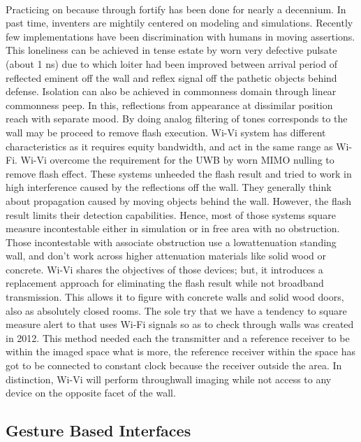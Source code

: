 \documentclass[a4paper,12pt,oneside]{article}
\begin{document}
\paragraph{}
Practicing on because through fortify has been done for nearly a decennium. In past time,
inventers are mightily centered on modeling and simulations. Recently few implementations
have been discrimination with humans in moving assertions. This loneliness can be achieved in
tense estate by worn very defective pulsate (about 1 ns) due to which loiter had been improved
between arrival period of reflected eminent off the wall and reflex signal off the pathetic objects
behind defense. Isolation can also be achieved in commonness domain through linear
commonness peep. In this, reflections from appearance at dissimilar position reach with separate
mood. By doing analog filtering of tones corresponds to the wall may be proceed to remove flash
execution. Wi-Vi system has different characteristics as it requires equity bandwidth, and act in
the same range as Wi-Fi. Wi-Vi overcome the requirement for the UWB by worn MIMO nulling
to remove flash effect. These systems unheeded the flash result and tried to work in high
interference caused by the reflections off the wall. They generally think about propagation
caused by moving objects behind the wall. However, the flash result limits their detection
capabilities. Hence, most of those systems square measure incontestable either in simulation or
in free area with no obstruction. Those incontestable with associate obstruction use a lowattenuation
standing wall, and don't work across higher attenuation materials like solid wood or
concrete. Wi-Vi shares the objectives of those devices; but, it introduces a replacement approach
for eliminating the flash result while not broadband transmission. This allows it to figure with
concrete walls and solid wood doors, also as absolutely closed rooms. The sole try that we have a
tendency to square measure alert to that uses Wi-Fi signals so as to check through walls was
created in 2012. This method needed each the transmitter and a reference receiver to be within
the imaged space what is more, the reference receiver within the space has got to be connected to
constant clock because the receiver outside the area. In distinction, Wi-Vi will perform throughwall
imaging while not access to any device on the opposite facet of the wall.

\subsection{Gesture Based Interfaces}
\end{document}
